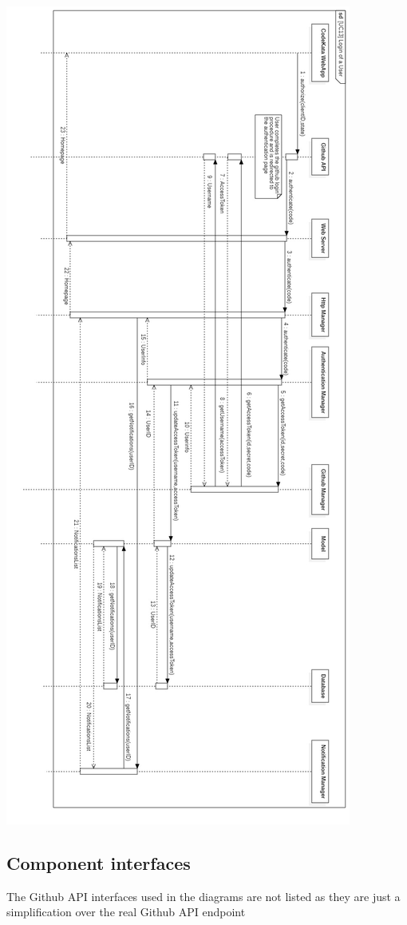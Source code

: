 \documentclass{article}
\begin{document}
\newpage
\begin{center}
    \includegraphics[angle=-90,width=0.5\linewidth]{uc13.jpg}
  \label{fig:uc13}
\end{center}

\newpage
\subsection{Component interfaces}
\label{ssc:ci}
The Github API interfaces used in the diagrams are not listed as they are just a simplification over the real Github API endpoint
\end{document}

